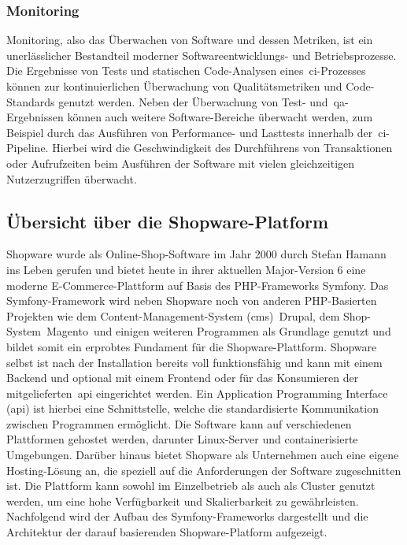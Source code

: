 \subsubsection{Monitoring}

Monitoring, also das Überwachen von Software und dessen Metriken, ist ein unerlässlicher Bestandteil moderner
Softwareentwicklungs- und Betriebsprozesse.
Die Ergebnisse von Tests und statischen Code-Analysen eines\ \acrshort{ci}-Prozesses können zur kontinuierlichen
Überwachung von Qualitätsmetriken und Code-Standards genutzt werden.
Neben der Überwachung von Test- und\ \acrshort{qa}-Ergebnissen können auch weitere Software-Bereiche überwacht werden,
zum Beispiel durch das Ausführen von Performance- und Lasttests innerhalb der\ \acrshort{ci}-Pipeline.
Hierbei wird die Geschwindigkeit des Durchführens von Transaktionen oder Aufrufzeiten beim Ausführen
der Software mit vielen gleichzeitigen Nutzerzugriffen überwacht.

\subsection{Übersicht über die Shopware-Platform} \label{subsec:02-background-3}

Shopware wurde als Online-Shop-Software im Jahr 2000 durch Stefan Hamann ins Leben gerufen
und bietet heute in ihrer aktuellen Major-Version 6 eine moderne E-Commerce-Plattform auf Basis des PHP-Frameworks
\glqq Symfony\grqq.
Das Symfony-Framework wird neben Shopware noch von anderen PHP-Basierten Projekten wie dem Content-Management-System
(\acrshort{cms})\ \glqq Drupal\grqq, dem Shop-System\ \glqq Magento\grqq\ und einigen weiteren
Programmen als Grundlage genutzt und bildet somit ein erprobtes Fundament für die
Shopware-Plattform.
Shopware selbst ist nach der Installation bereits voll funktionsfähig und kann mit einem Backend und optional
mit einem Frontend oder für das Konsumieren der mitgelieferten\ \acrshort{api} eingerichtet werden.
Ein Application Programming Interface (\acrshort{api}) ist hierbei eine Schnittstelle, welche die standardisierte
Kommunikation zwischen Programmen ermöglicht.
Die Software kann auf verschiedenen Plattformen gehostet werden, darunter Linux-Server und containerisierte Umgebungen.
Darüber hinaus bietet Shopware als Unternehmen auch eine eigene Hosting-Lösung an, die speziell auf die Anforderungen
der Software zugeschnitten ist.
Die Plattform kann sowohl im Einzelbetrieb als auch als Cluster genutzt werden, um eine hohe Verfügbarkeit und
Skalierbarkeit zu gewährleisten.
Nachfolgend wird der Aufbau des Symfony-Frameworks dargestellt und die Architektur der darauf basierenden
Shopware-Platform aufgezeigt.

